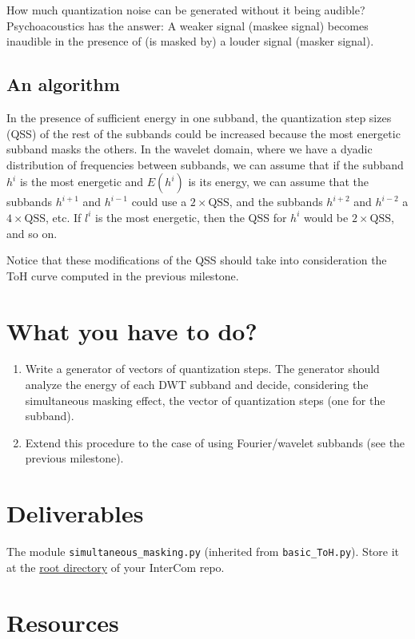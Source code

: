 How much quantization noise can be generated without it being audible?
Psychoacoustics has the answer: A weaker signal (maskee signal) becomes
inaudible in the presence of (is masked by) a louder signal (masker signal). 

\subsection{An algorithm}

In the presence of sufficient energy in one subband, the quantization
step sizes (QSS) of the rest of the subbands could be increased
because the most energetic subband masks the others. In the wavelet
domain, where we have a dyadic distribution of frequencies between
subbands, we can assume that if the subband $h^i$ is the most
energetic and $E(h^i)$ is its energy, we can assume that the subbands
$h^{i+1}$ and $h^{i-1}$ could use a $2\times\text{QSS}$, and the subbands $h^{i+2}$
and $h^{i-2}$ a $4\times\text{QSS}$, etc. If $l^i$ is the most energetic, then the
QSS for $h^i$ would be $2\times\text{QSS}$, and so on.

Notice that these modifications of the QSS should take into
consideration the ToH curve computed in the previous milestone.
  
\section{What you have to do?}

\begin{enumerate}
\item Write a generator of vectors of quantization steps. The
  generator should analyze the energy of each DWT subband and decide,
  considering the simultaneous masking effect, the vector of
  quantization steps (one for the subband).
\item Extend this procedure to the case of using Fourier/wavelet
  subbands (see the previous milestone).
\end{enumerate}

\section{Deliverables}

The module \verb|simultaneous_masking.py| (inherited from
\verb|basic_ToH.py|). Store it at the
\href{https://github.com/Tecnologias-multimedia/intercom}{root
  directory} of your InterCom repo.

\section{Resources}



